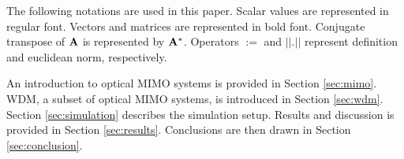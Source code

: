 The following notations are used in this paper. Scalar values are represented in regular font. Vectors and matrices are represented in bold font. Conjugate transpose of ${\bf{A}}$ is represented by ${\bf{A}}^{*}$. Operators $:=$ and $||.||$ represent definition and euclidean norm, respectively. 

An introduction to optical MIMO systems is provided in Section \ref{sec:mimo}. WDM, a subset of optical MIMO systems, is introduced in Section \ref{sec:wdm}. Section \ref{sec:simulation} describes the simulation setup. Results and discussion is provided in Section \ref{sec:results}. Conclusions are then drawn in Section \ref{sec:conclusion}. 